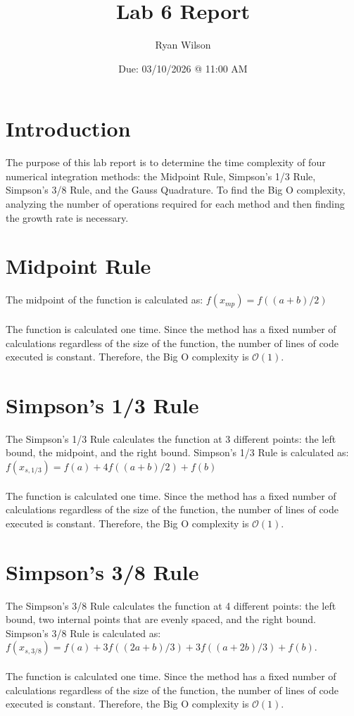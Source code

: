 \documentclass{article}
\title{Lab 6 Report}
\date{Due: 03/10/2026 @ 11:00 AM}
\author{Ryan Wilson}
\begin{document}
\maketitle
\newpage


\section{Introduction}
The purpose of this lab report is to determine the time complexity of four numerical integration methods: the Midpoint Rule, Simpson's 1/3 Rule, Simpson's 3/8 Rule, and the Gauss Quadrature. To find the Big O complexity, analyzing the number of operations required for each method and then finding the growth rate is necessary.

\section{Midpoint Rule}
The midpoint of the function is calculated as: $f(x_{mp}) = f((a + b)/2)$\\\\
The function is calculated one time. Since the method has a fixed number of calculations regardless of the size of the function, the number of lines of code executed is constant. Therefore, the Big O complexity is $\mathcal{O}(1)$.\\

\section{Simpson's 1/3 Rule}
The Simpson's 1/3 Rule calculates the function at 3 different points: the left bound, the midpoint, and the right bound. Simpson's 1/3 Rule is calculated as: $f(x_{s, 1/3}) = f(a) + 4f((a + b)/2) + f(b)$\\\\
The function is calculated one time. Since the method has a fixed number of calculations regardless of the size of the function, the number of lines of code executed is constant. Therefore, the Big O complexity is $\mathcal{O}(1)$.\\

\section{Simpson's 3/8 Rule}
The Simpson's 3/8 Rule calculates the function at 4 different points: the left bound, two internal points that are evenly spaced, and the right bound. Simpson's 3/8 Rule is calculated as: $f(x_{s, 3/8}) = f(a) + 3f((2a + b)/3) + 3f((a + 2b)/3) + f(b)$.\\\\
The function is calculated one time. Since the method has a fixed number of calculations regardless of the size of the function, the number of lines of code executed is constant. Therefore, the Big O complexity is $\mathcal{O}(1)$.\\
\end{document}
